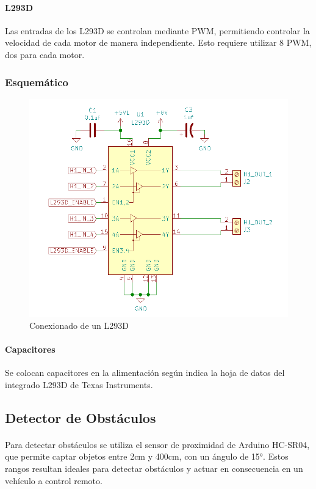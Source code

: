 \paragraph{L293D}Las entradas de los L293D se controlan mediante PWM, permitiendo
controlar la velocidad de cada motor de manera independiente. Esto requiere
utilizar 8 PWM, dos para cada motor.

\subsubsection{Esquemático}

\begin{figure}[H]
	\centering
	\includegraphics[width=0.7\linewidth]{informe_3/schem_L293D}
	\caption{Conexionado de un L293D}
	\label{fig:scheml293D}
\end{figure}

\paragraph{Capacitores} Se colocan capacitores en la alimentación según indica la hoja de datos del integrado L293D de Texas Instruments.

\subsection{Detector de Obstáculos}

\paragraph{} Para detectar obstáculos se utiliza el sensor de proximidad de Arduino
HC-SR04, que permite captar objetos entre 2cm y 400cm, con un ángulo de \ang{15}. 
Estos rangos resultan ideales para detectar obstáculos y actuar en consecuencia
en un vehículo a control remoto.

